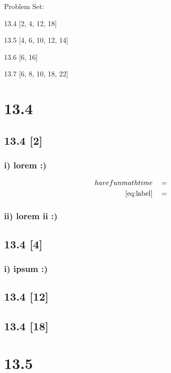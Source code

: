 \documentclass{article}
\begin{document}
{\large \noindent Problem Set:}

\par 13.4 [2, 4, 12, 18]
\par 13.5 [4, 6, 10, 12, 14]
\par 13.6 [6, 16]
\par 13.7 [6, 8, 10, 18, 22]
\vspace{5mm}

\noindent \hrulefill

\section*{13.4}
\setcounter{equation}{0}

\subsection*{13.4 [2]}

\subsubsection*{i) lorem :)}

\begin{align}
    \label{eq:label}
    have fun math time && &=
    \\
    \label{eq:label2}
    \eqref{eq:label} && &=
\end{align}
\subsubsection*{ii) lorem ii :)}

\subsection*{13.4 [4]}

\subsubsection*{i) ipsum :)}

\subsection*{13.4 [12]}
\subsection*{13.4 [18]}

\newpage

\section*{13.5}
\setcounter{equation}{0}
\end{document}
